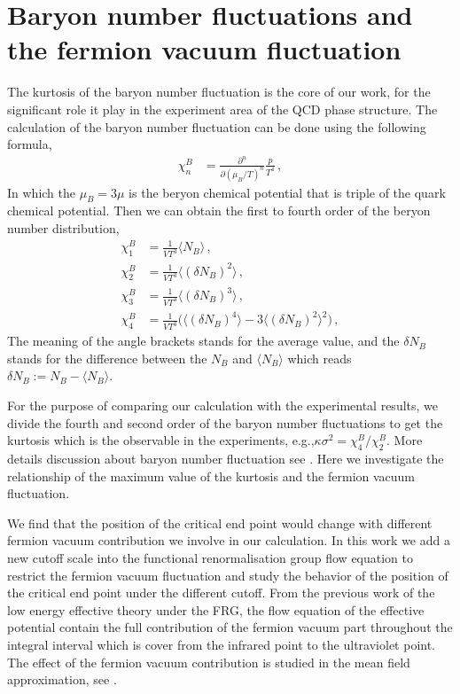 \documentclass[%
reprint,
superscriptaddress,
showpacs,preprintnumbers,
 amsmath,amssymb,
 aps,
prl,
]{revtex4-1}
\begin{document}
\section{Baryon number fluctuations and the fermion vacuum fluctuation}
\label{sec:EoS}
The kurtosis of the baryon number fluctuation is the core of our work, for the significant role it play in the experiment area of the QCD phase structure. The calculation of the baryon number fluctuation can be done using the following formula,
\begin{align}
   \chi_n^{B}&=\frac{\partial^n}{\partial (\mu_B/T)^n}\frac{p}{T^4}\,,\label{eq:suscept}
\end{align}
In which the $\mu_B=3\mu$ is the beryon chemical potential that is triple of the quark chemical potential. Then we can obtain the first to fourth order of the beryon number distribution,
\begin{align}
  \chi_1^B&=\frac{1}{VT^3}\langle N_B \rangle\,,\\[2ex]
  \chi_2^B&=\frac{1}{VT^3}\langle(\delta N_B)^2\rangle\,,\\[2ex]
  \chi_3^B&=\frac{1}{VT^3}\langle(\delta N_B)^3\rangle\,,\\[2ex]
  \chi_4^B&=\frac{1}{VT^3}\Big(\langle(\delta N_B)^4\rangle-3\langle(\delta N_B)^2\rangle^2\Big)\,,
\end{align}
The meaning of the angle brackets stands for the average value, and the $\delta N_B$ stands for the difference between the $N_B$ and $\langle N_B\rangle$ which reads $\delta N_B:=N_B - \langle N_B\rangle$.\par
For the purpose of comparing our calculation with the experimental results, we divide the fourth and second order of the baryon number fluctuations to get the kurtosis which is the observable in the experiments, e.g.,$\kappa\sigma^2=\chi^B_4/\chi^B_2$. More details discussion about baryon number fluctuation see \cite{Fu:2015naa}. Here we investigate the relationship of the maximum value of the kurtosis and the fermion vacuum fluctuation.
\par We find that the position of the critical end point would change with different fermion vacuum contribution we involve in our calculation. In this work we add a new cutoff scale into the functional renormalisation group flow equation to restrict the fermion vacuum fluctuation and study the behavior of the position of the critical end point under the different cutoff. From the previous work of the low energy effective theory under the FRG, the flow equation of the effective potential contain the full contribution of the fermion vacuum part throughout the integral interval which is cover from the infrared point to the ultraviolet point. The effect of the fermion vacuum contribution is studied in the mean field approximation, see \cite{Skokov:2010sf}.
\end{document}
